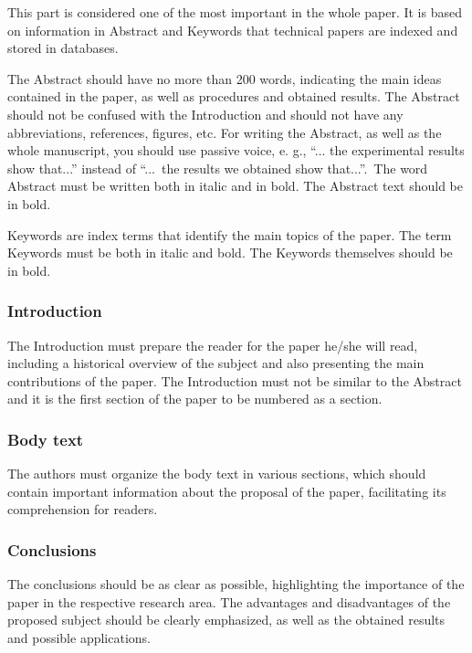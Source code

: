 \documentclass[english]{sobraep}
\begin{document}
This part is considered one of the most important in the whole paper. It is based on information in Abstract and Keywords that technical papers are indexed and stored in databases. 

The Abstract should have no more than 200 words, indicating the main ideas contained in the paper, as well as procedures and obtained results. The Abstract should not be confused with the Introduction and should not have any abbreviations, references, figures, etc. For writing the Abstract, as well as the whole manuscript, you should use passive voice, e. g.,  ``... the experimental results show that...'' instead of ``...~the results we obtained show that...''.~The word Abstract must be written both in italic and in bold. The Abstract text should be in bold.

\newpage
Keywords are index terms that identify the main topics of the paper. The term Keywords must be both in italic and bold. The Keywords themselves should be in bold.

\subsubsection{Introduction}

The Introduction must prepare the reader for the paper he/she will read, including a historical overview of the subject and also presenting the main contributions of the paper. The Introduction must not be similar to the Abstract and it is the first section of the paper to be numbered as a section.

\subsubsection{Body text}

The authors must organize the body text in various sections, which should contain important information about the proposal of the paper, facilitating its comprehension for readers.

\subsubsection{Conclusions}

The conclusions should be as clear as possible, highlighting the importance of the paper in the respective research area. The advantages and disadvantages of the proposed subject should be clearly emphasized, as well as the obtained results and possible applications.
\end{document}

